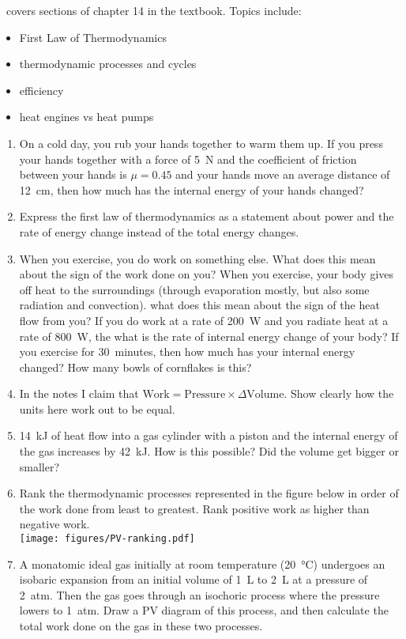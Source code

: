 \week \ covers sections of chapter 14 in the textbook. Topics include:

\begin{itemize}
	\item First Law of Thermodynamics
	\item thermodynamic processes and cycles
	\item efficiency
	\item heat engines vs heat pumps
\end{itemize}

\begin{enumerate}
	\setlength\itemsep{2 in}
	
\item 
On a cold day, you rub your hands together to warm them up. If you press your hands together with a force of \SI{5}{\newton} and the coefficient of friction between your hands is $\mu = 0.45$ and your hands move an average distance of \SI{12}{cm}, then how much has the internal energy of your hands changed?

\item
Express the first law of thermodynamics as a statement about power and the rate of energy change instead of the total energy changes. 

\item When you exercise, you do work on something else. What does this mean about the sign of the work done on you? When you exercise, your body gives off heat to the surroundings (through evaporation mostly, but also some radiation and convection). what does this mean about the sign of the heat flow from you? If you do work at a rate of \SI{200}{\watt} and you radiate heat at a rate of \SI{800}{\watt}, the what is the rate of internal energy change of your body? If you exercise for \SI{30}{minutes}, then how much has your internal energy changed? How many bowls of cornflakes is this? 

\item 
In the notes I claim that $\text{Work} = \text{Pressure}\times\Delta\text{Volume}$. Show clearly how the units here work out to be equal.

\item
\SI{14}{\kilo\joule} of heat flow into a gas cylinder with a piston and the internal energy of the gas increases by \SI{42}{\kilo\joule}. How is this possible? Did the volume get bigger or smaller?

\item 
Rank the thermodynamic processes represented in the figure below in order of the work done from least to greatest. Rank positive work as higher than negative work.\\
\texttt{[image: figures/PV-ranking.pdf]}
\vspace{-2in}
\item
A monatomic ideal gas initially at room temperature (\SI{20}{\celsius}) undergoes an isobaric expansion from an initial volume of \SI{1}{\liter} to \SI{2}{L} at a pressure of \SI{2}{atm}. Then the gas goes through an isochoric process where the pressure lowers to \SI{1}{atm}. Draw a PV diagram of this process, and then calculate the total work done on the gas in these two processes. 


\end{enumerate}
